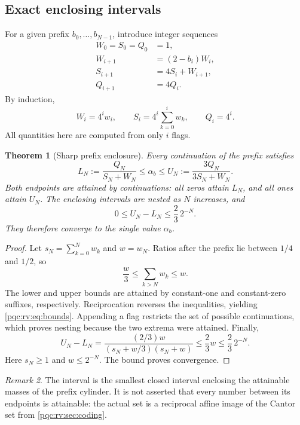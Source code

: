 \documentclass[11pt,letterpaper]{article}
\numberwithin{equation}{section}
\newtheorem{theorem}{Theorem}[section]
\theoremstyle{definition}
\theoremstyle{remark}
\newtheorem{remark}[theorem]{Remark}
\begin{document}
\subsection{Exact enclosing intervals}
For a given prefix $b_0,\ldots,b_{N-1}$, introduce integer sequences
\begin{align}
 W_0=S_0=Q_0&=1,\label{pqc:rv:eq:prefix-init}\\
 W_{i+1}&=(2-b_i)W_i,\nonumber\\
 S_{i+1}&=4S_i+W_{i+1},\label{pqc:rv:eq:prefix-rec}\\
 Q_{i+1}&=4Q_i.\nonumber
\end{align}
By induction,
\begin{equation}\label{pqc:rv:eq:prefix-values}
 W_i=4^iw_i,
 \qquad S_i=4^i\sum_{k=0}^iw_k,
 \qquad Q_i=4^i.
\end{equation}
All quantities here are computed from only $i$ flags.

\begin{theorem}[Sharp prefix enclosure]\label{pqc:rv:thm:prefix}
Every continuation of the prefix satisfies
\begin{equation}\label{pqc:rv:eq:bounds}
 L_N:=\frac{Q_N}{S_N+W_N}\leq\alpha_b\leq
 U_N:=\frac{3Q_N}{3S_N+W_N}.
\end{equation}
Both endpoints are attained by continuations: all zeros attain $L_N$,
and all ones attain $U_N$. The enclosing intervals are nested as
$N$ increases, and
\begin{equation}\label{pqc:rv:eq:width}
 0\leq U_N-L_N\leq\frac23\,2^{-N}.
\end{equation}
They therefore converge to the single value $\alpha_b$.
\end{theorem}
\begin{proof}
Let $s_N=\sum_{k=0}^Nw_k$ and $w=w_N$. Ratios after the prefix
lie between $1/4$ and $1/2$, so
\[
 \frac w3\leq\sum_{k>N}w_k\leq w.
\]
The lower and upper bounds are attained by constant-one and
constant-zero suffixes, respectively. Reciprocation reverses the
inequalities, yielding \cref{pqc:rv:eq:bounds}. Appending a flag restricts
the set of possible continuations, which proves nesting because
the two extrema were attained. Finally,
\[
 U_N-L_N
 =\frac{(2/3)w}{(s_N+w/3)(s_N+w)}
 \leq\frac23 w\leq\frac23\,2^{-N}.
\]
Here $s_N\geq1$ and $w\leq2^{-N}$. The bound proves convergence.
\end{proof}

\begin{remark}
The interval is the smallest closed interval enclosing the attainable
masses of the prefix cylinder. It is not asserted that every number
between its endpoints is attainable: the actual set is a reciprocal
affine image of the Cantor set from \cref{pqc:rv:sec:coding}.
\end{remark}
\end{document}
